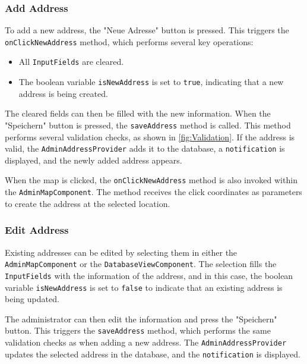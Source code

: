 \newpage

\subsubsection{Add Address}
    \label{fig:Add Address}

    \sloppy
    To add a new address, the "Neue Adresse" button is pressed. This triggers the \texttt{onClickNewAddress} method, which performs several key operations:  

    \begin{itemize}  
        \item All \texttt{InputFields} are cleared.  
        \item The boolean variable \texttt{isNewAddress} is set to \texttt{true}, indicating that a new address is being created.  
    \end{itemize}  
    
    The cleared fields can then be filled with the new information. When the "Speichern" button is pressed, the \texttt{saveAddress} method is called. This method performs several validation checks, as shown in \ref{fig:Validation}. If the address is valid, the \texttt{AdminAddressProvider} adds it to the database, a \texttt{notification} is displayed, and the newly added address appears.\blankLine
    
    When the map is clicked, the \texttt{onClickNewAddress} method is also invoked within the \texttt{AdminMapComponent}. The method receives the click coordinates as parameters to create the address at the selected location.  
    

\subsubsection{Edit Address}
\sloppy %
Existing addresses can be edited by selecting them in either the \texttt{AdminMapComponent} or the \texttt{DatabaseViewComponent}.
The selection fills the \texttt{InputFields} with the information of the address, and in this case, the boolean variable \texttt{isNewAddress} is set to \texttt{false} to indicate that an existing address is being updated.\blankLine

\sloppy
The administrator can then edit the information and press the "Speichern" button. This triggers the \texttt{saveAddress} method, which performs the same validation checks as when adding a new address. The \texttt{AdminAddressProvider} updates the selected address in the database, and the \texttt{notification} is displayed. \newpage

